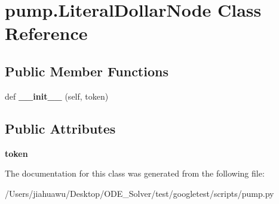 \hypertarget{classpump_1_1_literal_dollar_node}{}\section{pump.\+Literal\+Dollar\+Node Class Reference}
\label{classpump_1_1_literal_dollar_node}
\subsection*{Public Member Functions}
\begin{DoxyCompactItemize}
\item 
\mbox{\label{classpump_1_1_literal_dollar_node_a181cccad8a48f7dfdd0716e427897e0b}} 
def {\bfseries \+\_\+\+\_\+init\+\_\+\+\_\+} (self, token)
\end{DoxyCompactItemize}
\subsection*{Public Attributes}
\begin{DoxyCompactItemize}
\item 
\mbox{\label{classpump_1_1_literal_dollar_node_ab4c6e209635b8868bcdf0fe8053431c6}} 
{\bfseries token}
\end{DoxyCompactItemize}


The documentation for this class was generated from the following file\+:\begin{DoxyCompactItemize}
\item 
/\+Users/jiahuawu/\+Desktop/\+O\+D\+E\+\_\+\+Solver/test/googletest/scripts/pump.\+py\end{DoxyCompactItemize}
